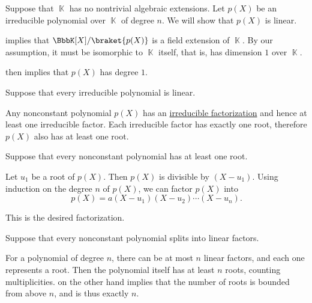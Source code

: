 \begin{defproof}
   Suppose that \( \BbbK \) has no nontrivial algebraic extensions. Let \( p(X) \) be an irreducible polynomial over \( \BbbK \) of degree \( n \). We will show that \( p(X) \) is linear.

   implies that \( \BbbK[X] / \braket{ p(X) } \) is a field extension of \( \BbbK \). By our assumption, it must be isomorphic to \( \BbbK \) itself, that is, has dimension \( 1 \) over \( \BbbK \).

   then implies that \( p(X) \) has degree \( 1 \).

   Suppose that every irreducible polynomial is linear.

  Any nonconstant polynomial \( p(X) \) has an \hyperref[def:irreducible_factorization]{irreducible factorization} and hence at least one irreducible factor. Each irreducible factor has exactly one root, therefore \( p(X) \) also has at least one root.

   Suppose that every nonconstant polynomial has at least one root.

  Let \( u_1 \) be a root of \( p(X) \). Then \( p(X) \) is divisible by \( (X - u_1) \). Using induction on the degree \( n \) of \( p(X) \), we can factor \( p(X) \) into
  \begin{equation*}
    p(X) = a (X - u_1) (X - u_2) \cdots (X - u_n).
  \end{equation*}

  This is the desired factorization.

   Suppose that every nonconstant polynomial splits into linear factors.

  For a polynomial of degree \( n \), there can be at most \( n \) linear factors, and each one represents a root. Then the polynomial itself has at least \( n \) roots, counting multiplicities.  on the other hand implies that the number of roots is bounded from above \( n \), and is thus exactly \( n \).


\end{defproof}
